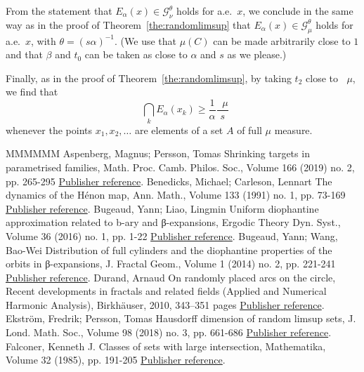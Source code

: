 \documentclass[11pt]{article}
\theoremstyle{definition}
\numberwithin{equation}{section}
\numberwithin{figure}{section}
\numberwithin{table}{section}
\DeclareMathOperator{\dimh}{dim_H}
\DeclareMathOperator{\udimh}{\overline{dim}_H}
\begin{document}
From the statement that $E_\alpha (x) \in \mathscr{G}_\nu^\theta$ holds for a.e.\ $x$, we conclude in the same way as in the proof of Theorem~\ref{the:randomlimsup} that $E_\alpha (x) \in
\mathscr{G}_\mu^\theta$ holds for a.e.\ $x$, with $\theta = (s
\alpha)^{-1}$. (We use that $\mu(C)$ can be made arbitrarily close to
$1$ and that $\beta$ and $t_0$ can be taken as  close to $\alpha$ and $s$ as we please.)

Finally, as in the proof of Theorem~\ref{the:randomlimsup}, by taking $t_2$ close to $\udimh \mu$, we find that
\[
\dimh \bigcap_k E_\alpha (x_k) \geq \frac{1}{\alpha} \frac{\udimh
\mu}{s}
\]
whenever the points $x_1, x_2, \ldots$ are elements of a set $A$ of full $\mu$ measure.

\begin{thebibliography}{MMMMMM}
 Aspenberg, Magnus; Persson, Tomas Shrinking targets in parametrised families, Math. Proc. Camb. Philos. Soc., Volume 166 (2019) no. 2, pp. 265-295 \href{https://ahl.centre-mersenne.org/item/AHL_2019__2__1_0/#aspenbergpersson}{Publisher reference}.
 Benedicks, Michael; Carleson, Lennart The dynamics of the Hénon map, Ann. Math., Volume 133 (1991) no. 1, pp. 73-169 \href{https://ahl.centre-mersenne.org/item/AHL_2019__2__1_0/#benedickscarleson}{Publisher reference}.
 Bugeaud, Yann; Liao, Lingmin Uniform diophantine approximation related to b-ary and β-expansions, Ergodic Theory Dyn. Syst., Volume 36 (2016) no. 1, pp. 1-22 \href{https://ahl.centre-mersenne.org/item/AHL_2019__2__1_0/#bugeaudliao}{Publisher reference}.
 Bugeaud, Yann; Wang, Bao-Wei Distribution of full cylinders and the diophantine properties of the orbits in β-expansions, J. Fractal Geom., Volume 1 (2014) no. 2, pp. 221-241 \href{https://ahl.centre-mersenne.org/item/AHL_2019__2__1_0/#bugeaudwang}{Publisher reference}.
 Durand, Arnaud On randomly placed arcs on the circle, Recent developments in fractals and related fields (Applied and Numerical Harmonic Analysis), Birkhäuser, 2010, 343–351 pages \href{https://ahl.centre-mersenne.org/item/AHL_2019__2__1_0/#durand}{Publisher reference}.
 Ekström, Fredrik; Persson, Tomas Hausdorff dimension of random limsup sets, J. Lond. Math. Soc., Volume 98 (2018) no. 3, pp. 661-686 \href{https://ahl.centre-mersenne.org/item/AHL_2019__2__1_0/#ekstrompersson}{Publisher reference}.
 Falconer, Kenneth J. Classes of sets with large intersection, Mathematika, Volume 32 (1985), pp. 191-205 \href{https://ahl.centre-mersenne.org/item/AHL_2019__2__1_0/#falconer1}{Publisher reference}.

\end{thebibliography}
\end{document}
